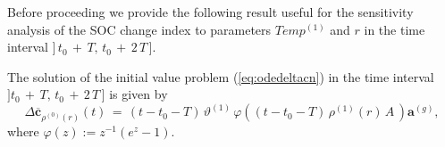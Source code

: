  
 \noindent Before proceeding we provide the following result useful for the sensitivity analysis of the SOC change index to parameters $Temp^{(1)}$ and $r$ in the time interval $]\,t_0\,+\,T,\, t_0\,+\,2\,T\,]$. 
\begin{theorem}\label{thm:delta c function n=1}
The solution of the initial value problem (\ref{eq:odedeltacn}) in the time interval  $]t_0\,+\,T,\, t_0\,+\,2\,T\,]$ is given by 
\begin{equation}\label{eq:delta c function n=1}
  \Delta \mathbf{\overline c}_{\rho^{(0)}(r)}(t)\,=\,(t-t_0-T)\,\vartheta^{(1)}\,\varphi\left( (t-t_0-T)\,\rho^{(1)}(r)\, A\,\right)\mathbf{a}^{(g)},
\end{equation}
where $\varphi(z):=z^{-1}(e^z-1)$.
\end{theorem}
